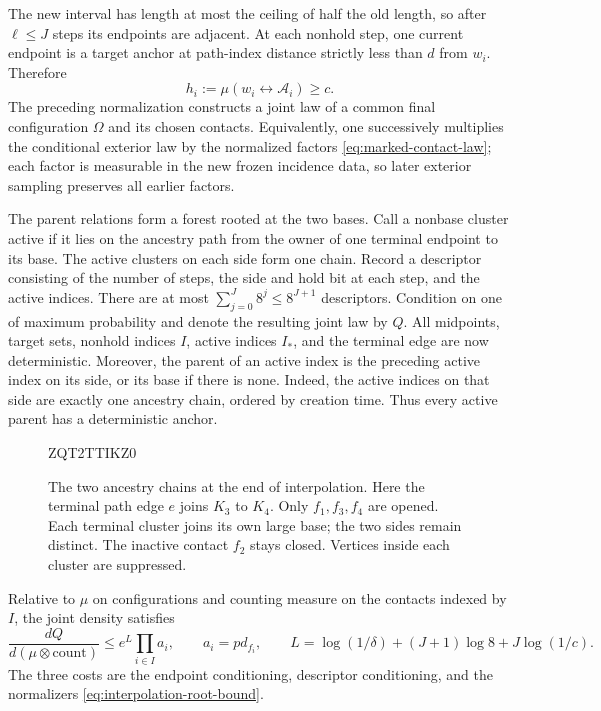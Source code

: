 \documentclass[11pt]{article}
\theoremstyle{definition}
\begin{document}
The new interval has length at most the ceiling of half the old length,
so after $\ell\le J$ steps its endpoints are adjacent. At each
nonhold step, one current endpoint is a target anchor at path-index
distance strictly less than $d$ from $w_i$. Therefore
\begin{equation}\label{eq:interpolation-root-bound}
 h_i:=\mu(w_i\leftrightarrow\mathcal A_i)\ge c.
\end{equation}
The preceding normalization constructs a joint law of a common final
configuration $\Omega$ and its chosen contacts. Equivalently, one
successively multiplies the conditional exterior law by the normalized
factors \eqref{eq:marked-contact-law}; each factor is measurable in the
new frozen incidence data, so later exterior sampling preserves all
earlier factors.

The parent relations form a forest rooted at the two bases. Call a
nonbase cluster active if it lies on the ancestry path from the owner
of one terminal endpoint to its base. The active clusters on each side
form one chain. Record a descriptor consisting of the number of steps,
the side and hold bit at each step, and the active indices. There are
at most $\sum_{j=0}^J8^j\le8^{J+1}$ descriptors. Condition on one of
maximum probability and denote the resulting joint law by $Q$.
All midpoints, target sets, nonhold indices $I$, active indices $I_*$,
and the terminal edge are now deterministic. Moreover, the parent of
an active index is the preceding active index on its side, or its base
if there is none. Indeed, the active indices on that side are exactly
one ancestry chain, ordered by creation time. Thus every active parent
has a deterministic anchor.

\begin{figure}[tbp]

ZQT2TTIKZ0
\caption{The two ancestry chains at the end of interpolation.
Here the terminal path edge $e$ joins $K_3$ to $K_4$.
Only $f_1,f_3,f_4$ are opened. Each terminal cluster joins its own
large base; the two sides remain distinct. The inactive contact
$f_2$ stays closed. Vertices inside each cluster are suppressed.}
\label{fig:interpolation}
\end{figure}


Relative to $\mu$ on configurations and counting measure on the
contacts indexed by $I$, the joint density satisfies
\begin{equation}\label{eq:interpolation-density}
 \frac{dQ}{d(\mu\otimes\mathrm{count})}
 \le e^L\prod_{i\in I}a_i,
 \qquad a_i=pd_{f_i},
 \qquad
 L=\log(1/\delta)+(J+1)\log8+J\log(1/c).
\end{equation}
The three costs are the endpoint conditioning, descriptor conditioning,
and the normalizers \eqref{eq:interpolation-root-bound}.
\end{document}
